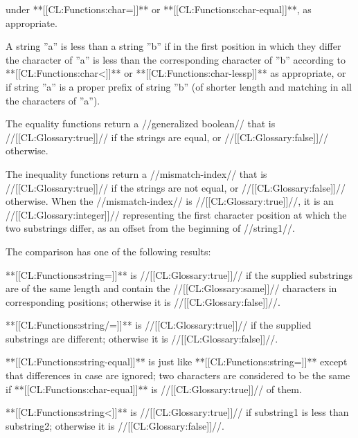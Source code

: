 under **[[CL:Functions:char=]]** or **[[CL:Functions:char-equal]]**, as appropriate.

A string ''a'' is less than a string ''b'' if in the first position in which they differ the character of ''a'' is less than the corresponding character of ''b'' according to **[[CL:Functions:char<]]** or **[[CL:Functions:char-lessp]]** as appropriate, or if string ''a'' is a proper prefix of string ''b'' (of shorter length and matching in all the characters of ''a'').

The equality functions return a //generalized boolean// that is //[[CL:Glossary:true]]// if the strings are equal, or //[[CL:Glossary:false]]// otherwise.

The inequality functions return a //mismatch-index// that is //[[CL:Glossary:true]]// if the strings are not equal, or //[[CL:Glossary:false]]// otherwise. When the //mismatch-index// is //[[CL:Glossary:true]]//, it is an //[[CL:Glossary:integer]]// representing the first character position at which the two substrings differ, as an offset from the beginning of //string1//.

The comparison has one of the following results:

\beginlist

\itemitem{**[[CL:Functions:string=]]**}

**[[CL:Functions:string=]]** is //[[CL:Glossary:true]]// if the supplied substrings are of the same length and contain the //[[CL:Glossary:same]]// characters in corresponding positions; otherwise it is //[[CL:Glossary:false]]//.

\itemitem{**[[CL:Functions:string/=]]**}

**[[CL:Functions:string/=]]** is //[[CL:Glossary:true]]// if the supplied substrings are different; otherwise it is //[[CL:Glossary:false]]//.


**[[CL:Functions:string-equal]]** is just like **[[CL:Functions:string=]]** except that differences in case are ignored; two characters are considered to be the same if **[[CL:Functions:char-equal]]** is //[[CL:Glossary:true]]// of them.


**[[CL:Functions:string<]]** is //[[CL:Glossary:true]]// if substring1 is less than substring2; otherwise it is //[[CL:Glossary:false]]//.


